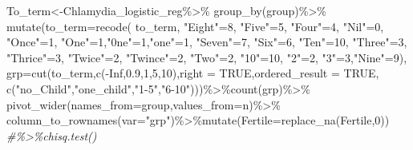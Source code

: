 \documentclass[
]{article}
\newenvironment{Shaded}{\begin{snugshade}}{\end{snugshade}}
\newcommand{\AttributeTok}[1]{\textcolor[rgb]{0.77,0.63,0.00}{#1}}
\newcommand{\CommentTok}[1]{\textcolor[rgb]{0.56,0.35,0.01}{\textit{#1}}}
\newcommand{\ConstantTok}[1]{\textcolor[rgb]{0.00,0.00,0.00}{#1}}
\newcommand{\DecValTok}[1]{\textcolor[rgb]{0.00,0.00,0.81}{#1}}
\newcommand{\FloatTok}[1]{\textcolor[rgb]{0.00,0.00,0.81}{#1}}
\newcommand{\FunctionTok}[1]{\textcolor[rgb]{0.00,0.00,0.00}{#1}}
\newcommand{\NormalTok}[1]{#1}
\newcommand{\OtherTok}[1]{\textcolor[rgb]{0.56,0.35,0.01}{#1}}
\newcommand{\SpecialCharTok}[1]{\textcolor[rgb]{0.00,0.00,0.00}{#1}}
\newcommand{\StringTok}[1]{\textcolor[rgb]{0.31,0.60,0.02}{#1}}
\begin{document}
\begin{Shaded}
\begin{Highlighting}[]
\NormalTok{To\_term}\OtherTok{\textless{}{-}}\NormalTok{Chlamydia\_logistic\_reg}\SpecialCharTok{\%\textgreater{}\%}
  \FunctionTok{group\_by}\NormalTok{(group)}\SpecialCharTok{\%\textgreater{}\%}
  \FunctionTok{mutate}\NormalTok{(}\AttributeTok{to\_term=}\FunctionTok{recode}\NormalTok{(}
\NormalTok{    to\_term,}
    \StringTok{"Eight"}\OtherTok{=}\DecValTok{8}\NormalTok{,}
    \StringTok{"Five"}\OtherTok{=}\DecValTok{5}\NormalTok{,}
    \StringTok{"Four"}\OtherTok{=}\DecValTok{4}\NormalTok{,}
    \StringTok{"Nil"}\OtherTok{=}\DecValTok{0}\NormalTok{,}
    \StringTok{"Once"}\OtherTok{=}\DecValTok{1}\NormalTok{,}
    \StringTok{"One"}\OtherTok{=}\DecValTok{1}\NormalTok{,}\StringTok{"0ne"}\OtherTok{=}\DecValTok{1}\NormalTok{,}\StringTok{"one"}\OtherTok{=}\DecValTok{1}\NormalTok{,}
    \StringTok{"Seven"}\OtherTok{=}\DecValTok{7}\NormalTok{,}
    \StringTok{"Six"}\OtherTok{=}\DecValTok{6}\NormalTok{,}
    \StringTok{"Ten"}\OtherTok{=}\DecValTok{10}\NormalTok{,}
    \StringTok{"Three"}\OtherTok{=}\DecValTok{3}\NormalTok{,}
    \StringTok{"Thrice"}\OtherTok{=}\DecValTok{3}\NormalTok{,}
    \StringTok{"Twice"}\OtherTok{=}\DecValTok{2}\NormalTok{,}
    \StringTok{"Twince"}\OtherTok{=}\DecValTok{2}\NormalTok{,}
    \StringTok{"Two"}\OtherTok{=}\DecValTok{2}\NormalTok{,}
    \StringTok{"10"}\OtherTok{=}\DecValTok{10}\NormalTok{,}
    \StringTok{"2"}\OtherTok{=}\DecValTok{2}\NormalTok{,}
    \StringTok{"3"}\OtherTok{=}\DecValTok{3}\NormalTok{,}\StringTok{"Nine"}\OtherTok{=}\DecValTok{9}\NormalTok{),}
    \AttributeTok{grp=}\FunctionTok{cut}\NormalTok{(to\_term,}\FunctionTok{c}\NormalTok{(}\SpecialCharTok{{-}}\ConstantTok{Inf}\NormalTok{,}\FloatTok{0.9}\NormalTok{,}\DecValTok{1}\NormalTok{,}\DecValTok{5}\NormalTok{,}\DecValTok{10}\NormalTok{),}\AttributeTok{right =} \ConstantTok{TRUE}\NormalTok{,}\AttributeTok{ordered\_result =} \ConstantTok{TRUE}\NormalTok{,}
            \FunctionTok{c}\NormalTok{(}\StringTok{"no\_Child"}\NormalTok{,}\StringTok{"one\_child"}\NormalTok{,}\StringTok{"1{-}5"}\NormalTok{,}\StringTok{"6{-}10"}\NormalTok{)))}\SpecialCharTok{\%\textgreater{}\%}\FunctionTok{count}\NormalTok{(grp)}\SpecialCharTok{\%\textgreater{}\%}
  \FunctionTok{pivot\_wider}\NormalTok{(}\AttributeTok{names\_from=}\NormalTok{group,}\AttributeTok{values\_from=}\NormalTok{n)}\SpecialCharTok{\%\textgreater{}\%}
  \FunctionTok{column\_to\_rownames}\NormalTok{(}\AttributeTok{var=}\StringTok{"grp"}\NormalTok{)}\SpecialCharTok{\%\textgreater{}\%}\FunctionTok{mutate}\NormalTok{(}\AttributeTok{Fertile=}\FunctionTok{replace\_na}\NormalTok{(Fertile,}\DecValTok{0}\NormalTok{))}
\CommentTok{\#\%\textgreater{}\%chisq.test()}


\end{Highlighting}
\end{Shaded}
\end{document}
